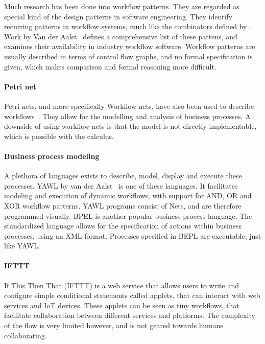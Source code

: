 Much research has been done into workflow patterns. They are regarded as special
kind of the design patterns in software engineering. They identify recurring patterns
in workflow systems, much like the combinators defined by \TOPHAT. Work by
Van der Aalst~\cite{journals/dpd/AalstHKB03} defines a comprehensive list of
these pattens, and examines their availability in industry workflow software.
Workflow patterns are usually described in terms of control flow graphs, and no
formal specification is given, which makes comparison and formal reasoning more
difficult.

\paragraph{Petri net}

Petri nets, and more specifically Workflow nets, have also been used to describe
workflows~\cite{journals/jcsc/Aalst98}. They allow for the modelling and
analysis of business processes. A downside of using workflow nets is that the
model is not directly implementable, which is possible with the \TOPHAT calculus.



\paragraph{Business process modeling}

A plethora of languages exists to describe, model, display and execute these
processes. YAWL by van der Aalst~\cite{DBLP:journals/is/AalstH05} is one of
these languages. It facilitates modeling and execution of dynamic workflows,
with support for AND, OR and XOR workflow patterns. YAWL programs consist of
Nets, and are therefore programmed visually. BPEL is another popular business process language.
The standardized language allows for the specification of actions within
business processes, using an XML format. Processes specified in BEPL are
executable, just like YAWL.


\paragraph{IFTTT}

If This Then That (IFTTT) is a web service that allows users to write and
configure simple conditional statements called applets, that can interact with
web services and IoT devices. These applets can be seen as tiny workflows, that
facilitate collaboration between different services and platforms. The
complexity of the flow is very limited however, and is not geared towards humans
collaborating.

